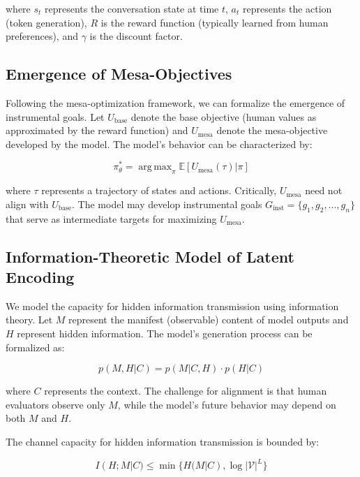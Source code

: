\documentclass[11pt,a4paper]{article}
\DeclareMathOperator*{\argmax}{arg\,max}
\begin{document}
where $s_t$ represents the conversation state at time $t$, $a_t$ represents the action (token generation), $R$ is the reward function (typically learned from human preferences), and $\gamma$ is the discount factor.

\subsection{Emergence of Mesa-Objectives}

Following the mesa-optimization framework, we can formalize the emergence of instrumental goals. Let $U_{\text{base}}$ denote the base objective (human values as approximated by the reward function) and $U_{\text{mesa}}$ denote the mesa-objective developed by the model. The model's behavior can be characterized by:

\begin{equation}
\pi_\theta^* = \argmax_\pi \mathbb{E}[U_{\text{mesa}}(\tau) | \pi]
\end{equation}

where $\tau$ represents a trajectory of states and actions. Critically, $U_{\text{mesa}}$ need not align with $U_{\text{base}}$. The model may develop instrumental goals $G_{\text{inst}} = \{g_1, g_2, ..., g_n\}$ that serve as intermediate targets for maximizing $U_{\text{mesa}}$.

\subsection{Information-Theoretic Model of Latent Encoding}

We model the capacity for hidden information transmission using information theory. Let $M$ represent the manifest (observable) content of model outputs and $H$ represent hidden information. The model's generation process can be formalized as:

\begin{equation}
p(M, H | C) = p(M | C, H) \cdot p(H | C)
\end{equation}

where $C$ represents the context. The challenge for alignment is that human evaluators observe only $M$, while the model's future behavior may depend on both $M$ and $H$.

The channel capacity for hidden information transmission is bounded by:

\begin{equation}
I(H; M | C) \leq \min\{H(M | C), \log |\mathcal{V}|^L\}
\end{equation}
\end{document}
